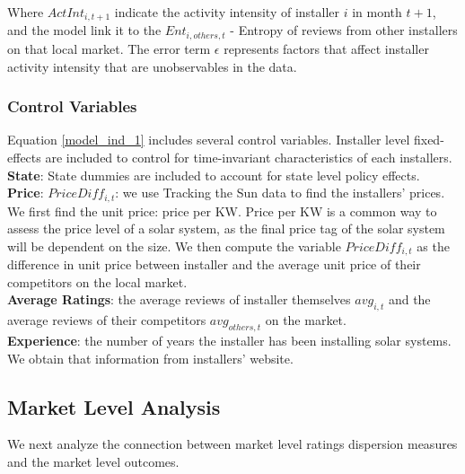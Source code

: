 \documentclass[msom,blindrev]{informs3}
\begin{document}
Where $ActInt_{i,t+1}$ indicate the activity intensity of installer $i$ in month $t+1$, and the model link it to the $Ent_{i,others,t}$ - Entropy of reviews from other installers on that local market. The error term $\epsilon$ represents factors that affect installer activity intensity that are unobservables in the data.  
\subsubsection{Control Variables\\}
Equation \ref{model_ind_1} includes several control variables. Installer level fixed-effects are included to control for time-invariant characteristics of each installers. \\	\textbf{State}: State dummies are included to account for state level policy effects. \\
\textbf{Price}:   $PriceDiff_{i,t}$: we use Tracking the Sun data to find the installers' prices. We first find the unit price: price per KW. Price per KW is a common way to assess the price level of a solar system, as the final price tag of the solar system will be dependent on the size. We then compute the variable $PriceDiff_{i,t}$ as the difference in unit price between installer and the average unit price of their competitors on the local market. \\
\textbf{Average Ratings}: the average reviews of installer themselves $avg_{i,t}$ and the average reviews of their competitors $avg_{others,t}$ on the market. \\
\textbf{Experience}: the number of years the installer has been installing solar systems. We obtain that information from installers' website. 

\subsection{Market Level Analysis}
We next analyze the connection between market level ratings dispersion measures and the market level outcomes. \\
 
\end{document}
